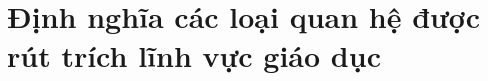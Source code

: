 \section{Định nghĩa các loại quan hệ được rút trích lĩnh vực giáo dục}\label{sec:inh-nghia-cac-loai-quan-he-uoc-rut-trich-linh-vuc-giao-duc}
